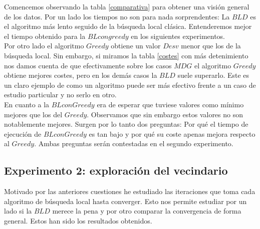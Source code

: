 \documentclass[11pt,a4paper]{article}
\begin{document}
	Comencemos observando la tabla \ref{comparativa} para obtener una visión general de los datos. Por un lado los tiempos no son para nada sorprendentes: La $BLD$ es el algoritmo más lento seguido de la búsqueda local clásica. Entenderemos mejor el tiempo obtenido para la $BL con greedy$ en los siguientes experimentos. \\
	
	Por otro lado el algoritmo $Greedy$ obtiene un valor $Desv$ menor que los de la búsqueda local. Sin embargo, si miramos la tabla \ref{costes} con más detenimiento nos damos cuenta de que efectivamente sobre los casos $MDG$ el algoritmo $Greedy$ obtiene mejores costes, pero en los demás casos la $BLD$ suele superarlo. Este es un claro ejemplo de como un algoritmo puede ser más efectivo frente a un caso de estudio particular y no serlo en otro. \\ 
	
	En cuanto a la $BL con Greedy$ era de esperar que tuviese valores como mínimo mejores que los del $Greedy$. Observamos que sin embargo estos valores no son notablemente mejores. Surgen por lo tanto dos preguntas: Por qué el tiempo de ejecución de $BL con Greedy$ es tan bajo y por qué su coste apenas mejora respecto al $Greedy$. Ambas preguntas serán contestadas en el segundo experimento. \\
	
	\subsection{ Experimento 2: exploración del vecindario }
	
	Motivado por las anteriores cuestiones he estudiado las iteraciones que toma cada algoritmo de búsqueda local hasta converger. Esto nos permite estudiar por un lado si la $BLD$ merece la pena y por otro comparar la convergencia de forma general. Estos han sido los resultados obtenidos. \\
	
\end{document}
